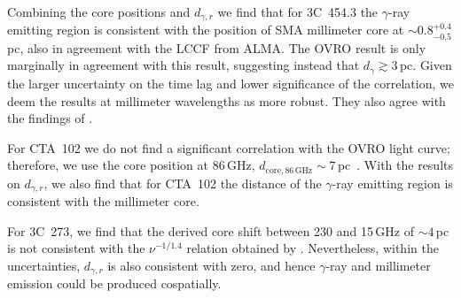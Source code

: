\documentclass[twocolumn]{aastex62}
\newcommand{\gray}{$\gamma$-ray\xspace}
\begin{document}
Combining the core positions and $d_{\gamma,r}$ we find that for 3C~454.3 the \gray emitting region is consistent with the position of SMA millimeter core at $\sim 0.8^{+0.4}_{-0.5}$\,pc, also in agreement with the LCCF from ALMA. The OVRO result is only marginally in agreement with this result, suggesting instead that $d_\gamma \gtrsim 3\,$pc.
Given the larger uncertainty on the time lag and lower significance of the correlation, we deem the results at millimeter wavelengths as more robust. 
They also agree with the findings of \citet{2014MNRAS.441.1899F}.

For CTA~102 we do not find a significant correlation with the OVRO light curve; therefore, we use the core position at 86\,GHz, $d_{\mathrm{core},86\,\mathrm{GHz}} \sim 7\,$pc~\citep{2015A&A...576A..43F}.
With the results on $d_{\gamma,r}$, we also find that for CTA~102 the distance of the \gray emitting region is consistent with the millimeter core.

For 3C~273, we find that the derived core shift between 230 and 15\,GHz of $\sim 4\,$pc is not consistent with the $\nu^{-1/1.4}$ relation obtained by \citet[][]{2013ARep...57...34V}. 
Nevertheless, within the uncertainties, $d_{\gamma,r}$ is also consistent with zero, and hence \gray and millimeter emission could be produced cospatially.
\end{document}
